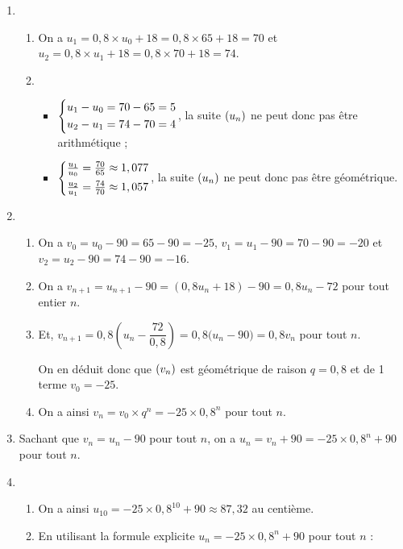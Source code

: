 \documentclass[a4paper,11pt]{article}
\begin{document}
\begin{enumerate}
	\item 
	\begin{enumerate}
		\item On a $u_1=0,8 \times u_0 + 18 = 0,8 \times 65 + 18=70$ et $u_2=0,8 \times u_1 + 18 = 0,8 \times 70 + 18=74$.
		\item 
		\begin{itemize}[leftmargin=*]
			\item $\begin{dcases} u_1 - u_0 = 70-65=5 \\ u_2-u_1=74-70=4 \end{dcases}$, la suite $\suiten$ ne peut donc pas être arithmétique ;
			\item $\begin{dcases} \tfrac{u_1}{u_0} = \tfrac{70}{65} \approx 1,077 \\ \tfrac{u_2}{u_1} = \tfrac{74}{70} \approx 1,057 \end{dcases}$, la suite $\suiten$ ne peut donc pas être géométrique.
		\end{itemize}
	\end{enumerate}
	\item 
	\begin{enumerate}
		\item On a $v_0=u_0-90=65-90=-25$, $v_1=u_1-90=70-90=-20$ et $v_2=u_2-90=74-90=-16$.
		
		\item On a $v_{n+1} = u_{n+1} - 90 = (0,8u_n+18)-90=0,8u_n-72$ pour tout entier $n$.
		\item Et, $v_{n+1}= 0,8 \left(u_n - \dfrac{72}{0,8}\right) = 0,8 \big( u_n - 90 \big) = 0,8v_n$ pour tout $n$.
		
		On en déduit donc que $\suiten[v]$ est géométrique de raison $q=0,8$ et de 1 terme $v_0=-25$. 
		\item On a ainsi $v_n = v_0 \times q^n = -25 \times 0,8 ^n$ pour tout $n$.
	\end{enumerate}
	\item Sachant que $v_n=u_n-90$ pour tout $n$, on a $u_n=v_n+90=-25 \times 0,8 ^n+90$ pour tout $n$.
	\item 
	\begin{enumerate}
		\item On a ainsi $u_{10}=-25 \times 0,8^{10}+90 \approx 87,32$ au centième.
		\item En utilisant la formule explicite $u_n=-25 \times 0,8 ^n+90$ pour tout $n$ :
		

\end{enumerate}
\end{enumerate}
\end{document}
